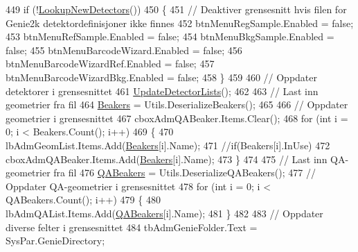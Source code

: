 \begin{DoxyCode}
449                 \textcolor{keywordflow}{if} (!\hyperlink{class_scintilab_1_1_form_main_a158d3b89f669d3b2a24ba750caef3eec}{LookupNewDetectors}())
450                 \{
451                     \textcolor{comment}{// Deaktiver grensesnitt hvis filen for Genie2k detektordefinisjoner ikke finnes}
452                     btnMenuRegSample.Enabled = \textcolor{keyword}{false};
453                     btnMenuRefSample.Enabled = \textcolor{keyword}{false};
454                     btnMenuBkgSample.Enabled = \textcolor{keyword}{false};
455                     btnMenuBarcodeWizard.Enabled = \textcolor{keyword}{false};
456                     btnMenuBarcodeWizardRef.Enabled = \textcolor{keyword}{false};
457                     btnMenuBarcodeWizardBkg.Enabled = \textcolor{keyword}{false};
458                 \}
459 
460                 \textcolor{comment}{// Oppdater detektorer i grensesnittet}
461                 \hyperlink{class_scintilab_1_1_form_main_a7919f1d4c3819a3c85df4107bbf82a59}{UpdateDetectorLists}();
462 
463                 \textcolor{comment}{// Last inn geometrier fra fil}
464                 \hyperlink{class_scintilab_1_1_form_main_aaff2cbfd906f576997bce08ece74dae8}{Beakers} = Utils.DeserializeBeakers();
465 
466                 \textcolor{comment}{// Oppdater geometrier i grensesnittet}
467                 cboxAdmQABeaker.Items.Clear();
468                 \textcolor{keywordflow}{for} (\textcolor{keywordtype}{int} i = 0; i < Beakers.Count(); i++)
469                 \{
470                     lbAdmGeomList.Items.Add(\hyperlink{class_scintilab_1_1_form_main_aaff2cbfd906f576997bce08ece74dae8}{Beakers}[i].Name);
471                     \textcolor{comment}{//if(Beakers[i].InUse)}
472                         cboxAdmQABeaker.Items.Add(\hyperlink{class_scintilab_1_1_form_main_aaff2cbfd906f576997bce08ece74dae8}{Beakers}[i].Name);
473                 \}
474 
475                 \textcolor{comment}{// Last inn QA-geometrier fra fil}
476                 \hyperlink{class_scintilab_1_1_form_main_af318208d55e4a144a14abde1adc7559d}{QABeakers} = Utils.DeserializeQABeakers();
477                 \textcolor{comment}{// Oppdater QA-geometrier i grensesnittet}
478                 \textcolor{keywordflow}{for} (\textcolor{keywordtype}{int} i = 0; i < QABeakers.Count(); i++)
479                 \{
480                     lbAdmQAList.Items.Add(\hyperlink{class_scintilab_1_1_form_main_af318208d55e4a144a14abde1adc7559d}{QABeakers}[i].Name);
481                 \}
482 
483                 \textcolor{comment}{// Oppdater diverse felter i grensesnittet}
484                 tbAdmGenieFolder.Text = SysPar.GenieDirectory;

\end{DoxyCode}
